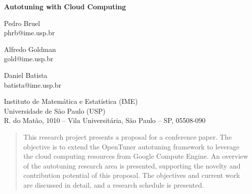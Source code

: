 \documentclass[a4paper, 12pt]{article}
\begin{document}
\hypersetup{backref,pdfpagemode=FullScreen,colorlinks=true}

\thispagestyle{empty}
\begin{center}
    \textbf{\Large{Autotuning with Cloud Computing}}\\

    \vspace*{0.5cm}

    \begin{minipage}{.3\linewidth}
        \begin{flushleft}
            Pedro Bruel\\
            phrb@ime.usp.br
        \end{flushleft}
    \end{minipage}
    \begin{minipage}{.3\linewidth}
        \begin{center}
            Alfredo Goldman\\
            gold@ime.usp.br
        \end{center}
    \end{minipage}
    \begin{minipage}{.3\linewidth}
        \begin{flushright}
            Daniel Batista\\
            batista@ime.usp.br
        \end{flushright}
    \end{minipage}

    \vskip 0.5cm

    \normalsize{Instituto de Matemática e Estatística (IME)\\
                Universidade de São Paulo (USP)\\
                R. do Matão, 1010 – Vila Universitária, São Paulo – SP, 05508-090\\}

\end{center}

\begin{abstract}
This research project presents a proposal for a conference paper.
The objective is to extend the OpenTuner autotuning framework to
leverage the cloud computing resources from Google Compute Engine.
An overview of the autotuning research area is presented,
supporting the novelty and contribution potential of this proposal.
The objectives and current work are discussed in detail, and a research
schedule is presented.
\end{abstract}
\end{document}
